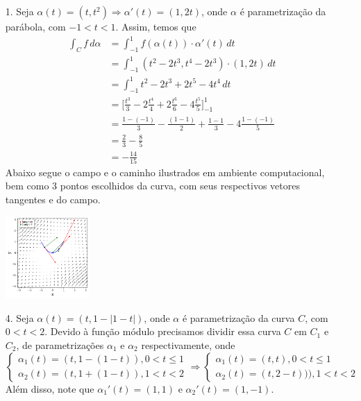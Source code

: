 \documentclass[../main.tex]{subfiles}
\begin{document}
	\begin{solucao}
		\begin{enumerate}
			\item[1.] Seja $\alpha(t)=(t,t^2)\Rightarrow \alpha'(t)=(1,2t)$, onde $\alpha$ é parametrização da parábola, com $-1<t<1$. Assim, temos que
			\begin{align*}
				\int_C f\, d\alpha
				&=\int_{-1}^1 f(\alpha(t))\cdot \alpha'(t)\, dt\\
				&=\int_{-1}^1 (t^2-2t^3, t^4-2t^3)\cdot (1,2t)\, dt\\
				&=\int_{-1}^1 t^2-2t^3+2t^5-4t^4\, dt \\
				&=\bigg[\frac{t^3}{3}-2\frac{t^4}{4}+2\frac{t^6}{6}-4\frac{t^5}{5}\bigg]_{-1}^1\\
				&=\frac{1-(-1)}{3}-\frac{(1-1)}{2}+\frac{1-1}{3}-4\frac{1-(-1)}{5}\\
				&=\frac{2}{3}-\frac{8}{5}\\
				&=-\frac{14}{15}
			\end{align*}
			Abaixo segue o campo e o caminho ilustrados em ambiente computacional, bem como 3 pontos escolhidos da curva, com seus respectivos vetores tangentes e do campo.
			\begin{center}
				\includegraphics[width=0.25\textwidth]{imagens/lista06/picture_lista06_q01_item01.png}
			\end{center}
			\item[4.] Seja $\alpha(t)=(t,1-|1-t|)$, onde $\alpha$ é parametrização da curva $C$, com $0<t<2$. Devido à função módulo precisamos dividir essa curva $C$ em $C_1$ e $C_2$, de parametrizações $\alpha_1$ e $\alpha_2$ respectivamente, onde
			\[
			\begin{cases} \alpha_1(t)=(t,1-(1-t)), 0<t\leq 1 \\ \alpha_2(t)=(t,1+(1-t)), 1<t<2 \end{cases}\Rightarrow \begin{cases} \alpha_1(t)=(t,t), 0<t\leq 1 \\ \alpha_2(t)=(t,2-t))), 1<t<2 \end{cases}
			\]
			Além disso, note que $\alpha_1'(t)=(1,1)$ e $\alpha_2'(t)=(1,-1)$.

\end{enumerate}
\end{solucao}
\end{document}
